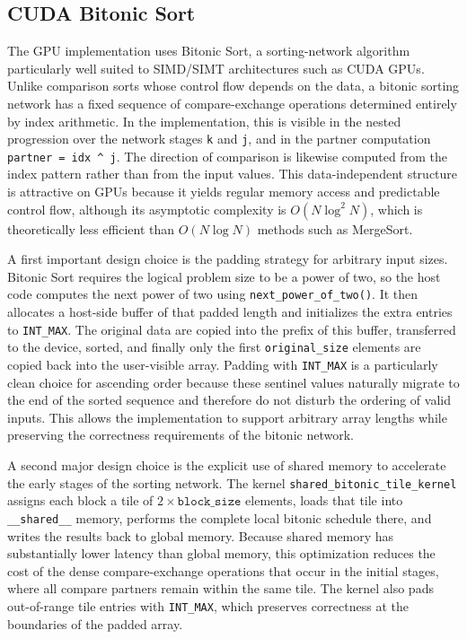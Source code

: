 \documentclass[12pt, a4paper]{article}
\begin{document}
\subsection{CUDA Bitonic Sort}
The GPU implementation uses Bitonic Sort, a sorting-network algorithm particularly well suited to SIMD/SIMT architectures such as CUDA GPUs. Unlike comparison sorts whose control flow depends on the data, a bitonic sorting network has a fixed sequence of compare-exchange operations determined entirely by index arithmetic. In the implementation, this is visible in the nested progression over the network stages \texttt{k} and \texttt{j}, and in the partner computation \texttt{partner = idx \^{} j}. The direction of comparison is likewise computed from the index pattern rather than from the input values. This data-independent structure is attractive on GPUs because it yields regular memory access and predictable control flow, although its asymptotic complexity is $O(N \log^2 N)$, which is theoretically less efficient than $O(N \log N)$ methods such as MergeSort.

A first important design choice is the padding strategy for arbitrary input sizes. Bitonic Sort requires the logical problem size to be a power of two, so the host code computes the next power of two using \texttt{next\_power\_of\_two()}. It then allocates a host-side buffer of that padded length and initializes the extra entries to \texttt{INT\_MAX}. The original data are copied into the prefix of this buffer, transferred to the device, sorted, and finally only the first \texttt{original\_size} elements are copied back into the user-visible array. Padding with \texttt{INT\_MAX} is a particularly clean choice for ascending order because these sentinel values naturally migrate to the end of the sorted sequence and therefore do not disturb the ordering of valid inputs. This allows the implementation to support arbitrary array lengths while preserving the correctness requirements of the bitonic network.

A second major design choice is the explicit use of shared memory to accelerate the early stages of the sorting network. The kernel \texttt{shared\_bitonic\_tile\_kernel} assigns each block a tile of $2 \times \texttt{block\_size}$ elements, loads that tile into \texttt{\_\_shared\_\_} memory, performs the complete local bitonic schedule there, and writes the results back to global memory. Because shared memory has substantially lower latency than global memory, this optimization reduces the cost of the dense compare-exchange operations that occur in the initial stages, where all compare partners remain within the same tile. The kernel also pads out-of-range tile entries with \texttt{INT\_MAX}, which preserves correctness at the boundaries of the padded array.
\end{document}
